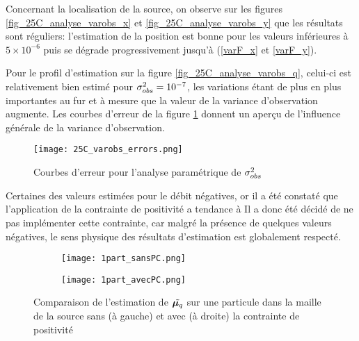          Concernant la localisation de la source, on observe sur les figures \ref{fig_25C_analyse_varobs_x} et \ref{fig_25C_analyse_varobs_y} que les résultats sont réguliers: l'estimation de la position est bonne pour les valeurs inférieures à $5\times 10^{-6}$ puis se dégrade progressivement jusqu'à  (\ref{varF_x} et \ref{varF_y}).
         
         Pour le profil d'estimation  sur la figure \ref{fig_25C_analyse_varobs_q}, celui-ci est relativement bien estimé pour ${\sigma_{obs}^2}=10^{-7}$, les variations étant de plus en plus importantes au fur et à mesure que la valeur de la variance d'observation augmente. Les courbes d'erreur de la figure \ref{fig_25C_varobs_erreurs} donnent un aperçu de l'influence générale de la variance d'observation.
         
         \begin{figure}[h!]
         	\centering
         	\texttt{[image: 25C\_varobs\_errors.png]}
         	\caption{Courbes d'erreur pour l'analyse paramétrique de ${\sigma_{obs}^2}$}
         	\label{fig_25C_varobs_erreurs}
         \end{figure}
         
         
         Certaines des valeurs estimées pour le débit  négatives, or il a été constaté que l'application de la contrainte de positivité a tendance à  Il a donc été décidé de ne pas implémenter cette contrainte, car malgré la présence de quelques valeurs négatives, le sens physique des résultats d'estimation est globalement respecté.
       
\begin{figure}[h!]
    	\centering
         	\begin{subfigure}[t]{0.5\textwidth}
         		\centering
         		\texttt{[image: 1part\_sansPC.png]}
         		\caption{}
         		\label{sansPC}
         	\end{subfigure}%
         	\begin{subfigure}[t]{0.5\textwidth}
         		\centering
         		\texttt{[image: 1part\_avecPC.png]}
         		\caption{}
         		\label{avecPC}
         	\end{subfigure}
         	\caption{Comparaison de l'estimation de $\tilde{{\bm{\mu}_q}}$ sur une particule dans la maille de la source sans (à gauche) et avec (à droite) la contrainte de positivité}
         	\label{fig_sansavecPC}
         \end{figure}

